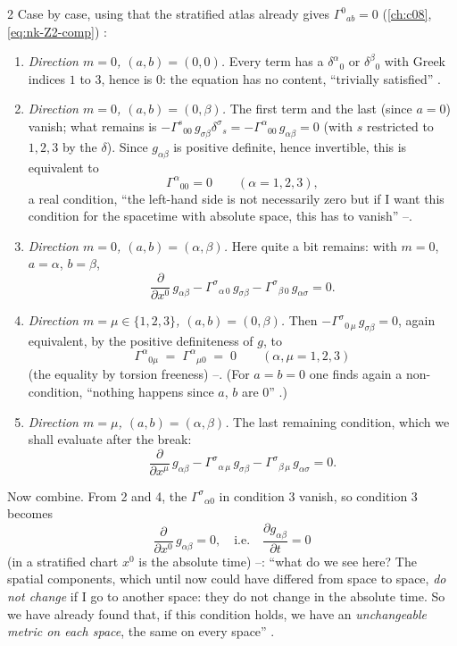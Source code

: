 \begin{paracol}{2}
Case by case, using that the stratified atlas already gives $\Gamma^0{}_{ab}=0$ (\cref{ch:c08}, \eqref{eq:nk-Z2-comp}) :
\begin{enumerate}
  \item \emph{Direction $m=0$, $(a,b)=(0,0)$.} Every term has a $\delta^\alpha{}_0$ or $\delta^\beta{}_0$ with Greek indices $1$ to $3$, hence is $0$: the
        equation has no content, ``trivially satisfied'' .
  \item \emph{Direction $m=0$, $(a,b)=(0,\beta)$.} The first term and the last (since $a=0$) vanish; what remains is
        $-\Gamma^s{}_{00}\,g_{\sigma\beta}\delta^\sigma{}_s=-\Gamma^\alpha{}_{00}\,g_{\alpha\beta}=0$ (with $s$ restricted to $1,2,3$ by the $\delta$). Since $g_{\alpha\beta}$ is positive definite, hence invertible, this is
        equivalent to
        \[
          \Gamma^\alpha{}_{00}=0\qquad(\alpha=1,2,3),
        \]
        a real condition, ``the left-hand side is not necessarily zero but if I want this condition for the spacetime with absolute space, this has to vanish'' --.
  \item \emph{Direction $m=0$, $(a,b)=(\alpha,\beta)$.} Here quite a bit remains: with $m=0$, $a=\alpha$, $b=\beta$,
        \[
          \frac{\partial}{\partial x^0}\,g_{\alpha\beta}-\Gamma^\sigma{}_{\alpha\,0}\,g_{\sigma\beta}-\Gamma^\sigma{}_{\beta\,0}\,g_{\alpha\sigma}=0 .
        \]
  \item \emph{Direction $m=\mu\in\{1,2,3\}$, $(a,b)=(0,\beta)$.} Then $-\Gamma^\sigma{}_{0\,\mu}\,g_{\sigma\beta}=0$, again equivalent, by the positive definiteness of $g$, to
        \[
          \Gamma^\alpha{}_{0\mu}\;=\;\Gamma^\alpha{}_{\mu0}\;=\;0\qquad(\alpha,\mu=1,2,3)
        \]
        (the equality by torsion freeness) --. (For $a=b=0$ one finds again a non-condition, ``nothing happens since $a$, $b$ are $0$'' .)
  \item \emph{Direction $m=\mu$, $(a,b)=(\alpha,\beta)$.} The last remaining condition, which we shall evaluate after the break:
        \[
          \frac{\partial}{\partial x^\mu}\,g_{\alpha\beta}-\Gamma^\sigma{}_{\alpha\,\mu}\,g_{\sigma\beta}-\Gamma^\sigma{}_{\beta\,\mu}\,g_{\alpha\sigma}=0 .
        \]
\end{enumerate}
Now combine. From 2 and 4, the $\Gamma^\sigma{}_{\alpha0}$ in condition 3 vanish, so condition 3 becomes
\begin{equation}\label{eq:as-time-indep}
  \frac{\partial}{\partial x^0}\,g_{\alpha\beta}=0,\quad\text{i.e.}\quad\frac{\partial g_{\alpha\beta}}{\partial t}=0
\end{equation}
(in a stratified chart $x^0$ is the absolute time) --: ``what do we see here? The spatial components, which until now could have differed from space to space, \emph{do not change} if I go to another space: they do not change in the absolute time. So
we have already found that, if this condition holds, we have an \emph{unchangeable metric on each space}, the same on every space'' .


\end{paracol}
